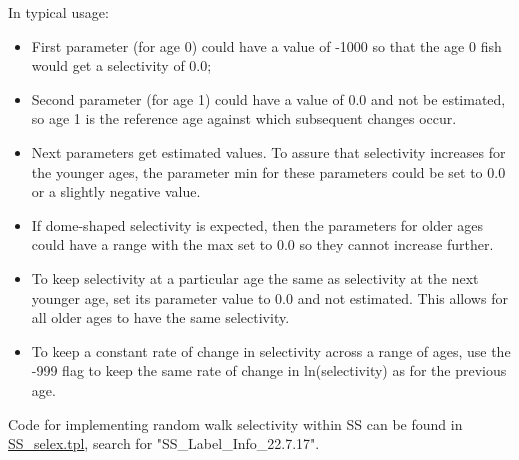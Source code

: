 In typical usage:
	\begin{itemize}
		\item First parameter (for age 0) could have a value of -1000 so that the age 0 fish would get a selectivity of 0.0;
		\item 	Second parameter (for age 1) could have a value of 0.0 and not be estimated, so age 1 is the reference age against which subsequent changes occur.
		\item 	Next parameters get estimated values.  To assure that selectivity increases for the younger ages, the parameter min for these parameters could be set to 0.0 or a slightly negative value.
		\item If dome-shaped selectivity is expected, then the parameters for older ages could have a range with the max set to 0.0 so they cannot increase further.
		\item To keep selectivity at a particular age the same as selectivity at the next younger age, set its parameter value to 0.0 and not estimated.  This allows for all older ages to have the same selectivity.
		\item 	To keep a constant rate of change in selectivity across a range of ages, use the -999 flag to keep the same rate of change in ln(selectivity) as for the previous age.
	\end{itemize}

Code for implementing random walk selectivity within SS can be found in \href{https://github.com/nmfs-stock-synthesis/stock-synthesis/blob/main/SS_selex.tpl}{SS\_selex.tpl}, search for "SS\_Label\_Info\_22.7.17".


